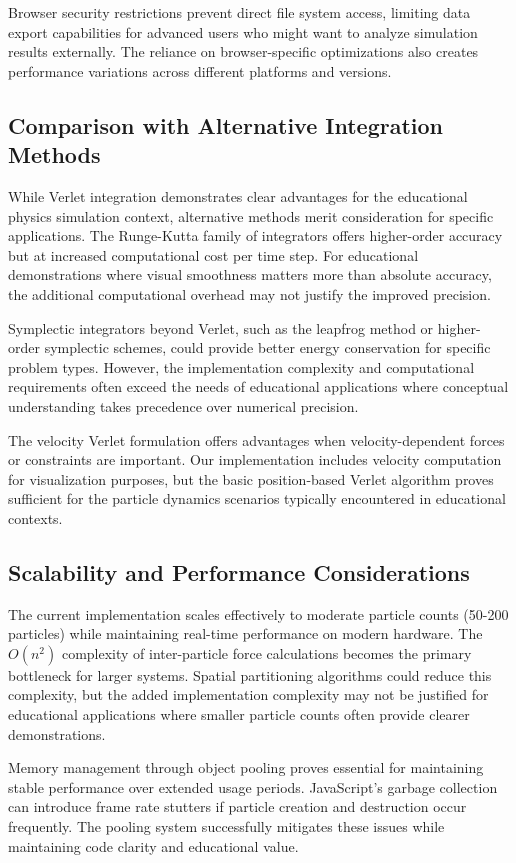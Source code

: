 \documentclass[12pt,journal,onecolumn]{IEEEtran}
\begin{document}
Browser security restrictions prevent direct file system access, limiting data export capabilities for advanced users who might want to analyze simulation results externally. The reliance on browser-specific optimizations also creates performance variations across different platforms and versions.

\subsection{Comparison with Alternative Integration Methods}
While Verlet integration demonstrates clear advantages for the educational physics simulation context, alternative methods merit consideration for specific applications. The Runge-Kutta family of integrators offers higher-order accuracy but at increased computational cost per time step. For educational demonstrations where visual smoothness matters more than absolute accuracy, the additional computational overhead may not justify the improved precision.

Symplectic integrators beyond Verlet, such as the leapfrog method or higher-order symplectic schemes, could provide better energy conservation for specific problem types. However, the implementation complexity and computational requirements often exceed the needs of educational applications where conceptual understanding takes precedence over numerical precision.

The velocity Verlet formulation offers advantages when velocity-dependent forces or constraints are important. Our implementation includes velocity computation for visualization purposes, but the basic position-based Verlet algorithm proves sufficient for the particle dynamics scenarios typically encountered in educational contexts.

\subsection{Scalability and Performance Considerations}
The current implementation scales effectively to moderate particle counts (50-200 particles) while maintaining real-time performance on modern hardware. The $O(n^2)$ complexity of inter-particle force calculations becomes the primary bottleneck for larger systems. Spatial partitioning algorithms could reduce this complexity, but the added implementation complexity may not be justified for educational applications where smaller particle counts often provide clearer demonstrations.

Memory management through object pooling proves essential for maintaining stable performance over extended usage periods. JavaScript's garbage collection can introduce frame rate stutters if particle creation and destruction occur frequently. The pooling system successfully mitigates these issues while maintaining code clarity and educational value.
\end{document}
